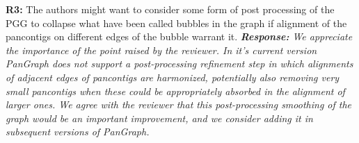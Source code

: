 \documentclass[aps,rmp,onecolumn]{revtex4-1}
\newcommand{\Marco}[1]{{\color{orange}Marco: #1}}
\newcommand{\reviewer}[2]{\textbf{#1:} #2\vskip 5mm}
\newcommand{\response}[1]{{\it {\color{response}\textbf{Response:} #1}}\vskip 5mm}
\begin{document}


\reviewer{R3}{The authors might want to consider some form of post processing of the PGG to collapse what have been called bubbles in the graph if alignment of the pancontigs on different edges of the bubble warrant it.}
\response{
      We appreciate the importance of the point raised by the reviewer.
      In it's current version \textit{PanGraph} does not support a post-processing refinement step in which alignments of adjacent edges of pancontigs are harmonized, potentially also removing very small pancontigs when these could be appropriately absorbed in the alignment of larger ones.
      We agree with the reviewer that this post-processing smoothing of the graph would be an important improvement, and we consider adding it in subsequent versions of \textit{PanGraph}.
}
\end{document}
